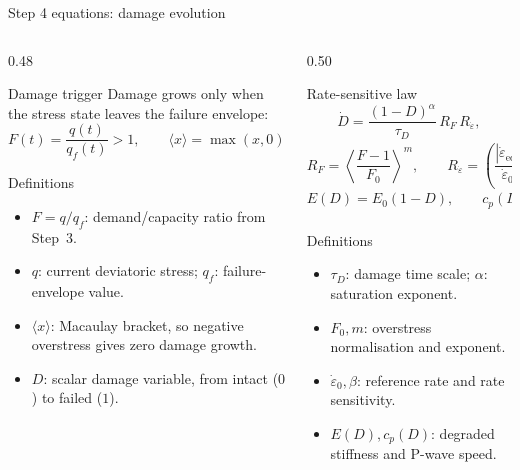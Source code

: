 \documentclass[11pt,aspectratio=169]{beamer}
\begin{document}
\begin{frame}{Step 4 equations: damage evolution}
  \scriptsize
  \begin{columns}[T,onlytextwidth]
    \begin{column}{0.48\textwidth}
      \begin{alertblock}{Damage trigger}
        Damage grows only when the stress state leaves the failure envelope:
        \[
          F(t)=\frac{q(t)}{q_f(t)}>1,\qquad
          \langle x\rangle=\max(x,0).
        \]
      \end{alertblock}
      \begin{block}{Definitions}
        \begin{itemize}
          \item $F=q/q_f$: demand/capacity ratio from Step~3.
          \item $q$: current deviatoric stress; $q_f$: failure-envelope value.
          \item $\langle x\rangle$: Macaulay bracket, so negative overstress gives zero damage growth.
          \item $D$: scalar damage variable, from intact ($0$) to failed ($1$).
        \end{itemize}
      \end{block}
    \end{column}
    \begin{column}{0.50\textwidth}
      \begin{exampleblock}{Rate-sensitive law}
        \[
          \dot{D}=\frac{(1-D)^\alpha}{\tau_D}
          \,R_F\,R_{\dot{\varepsilon}},
        \]
        \[
          R_F=\left\langle\frac{F-1}{F_0}\right\rangle^m,
          \qquad
          R_{\dot{\varepsilon}}=
          \left(\frac{|\dot{\varepsilon}_{\mathrm{eq}}|}
          {\dot{\varepsilon}_0}\right)^\beta .
        \]
        \[
          E(D)=E_0(1-D),\qquad
          c_p(D)=c_{p0}\sqrt{\max(1-D,0)}.
        \]
      \end{exampleblock}
      \begin{block}{Definitions}
        \begin{itemize}
          \item $\tau_D$: damage time scale; $\alpha$: saturation exponent.
          \item $F_0,m$: overstress normalisation and exponent.
          \item $\dot{\varepsilon}_0,\beta$: reference rate and rate sensitivity.
          \item $E(D),c_p(D)$: degraded stiffness and P-wave speed.
        \end{itemize}
      \end{block}
    \end{column}
  \end{columns}
\end{frame}
\end{document}
